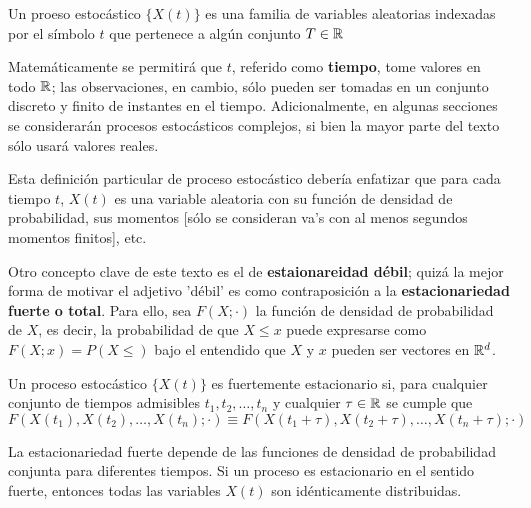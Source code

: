 \begin{defn}
Un proeso estoc\'astico $\{ X(t) \}$ es una familia de variables aleatorias indexadas por el 
s\'imbolo $t$ que pertenece a alg\'un conjunto $T \in \mathbb{R}$
\end{defn}

Matem\'aticamente se permitir\'a que $t$, referido como \textbf{tiempo}, tome valores 
en todo $\mathbb{R}$; las observaciones, en cambio,
s\'olo pueden ser tomadas en un conjunto discreto y finito de instantes en el tiempo. 
Adicionalmente, en algunas secciones se considerar\'an procesos estoc\'asticos complejos,
si bien la mayor parte del texto s\'olo usar\'a valores reales.

Esta definici\'on particular de proceso estoc\'astico deber\'ia enfatizar que para cada 
tiempo $t$, $X(t)$ es una variable aleatoria con su funci\'on de densidad de probabilidad,
sus momentos [s\'olo se consideran va's con al menos segundos momentos finitos], etc.

Otro concepto clave de este texto es el de \textbf{estaionareidad d\'ebil}; 
quiz\'a la mejor forma de motivar el adjetivo 'd\'ebil' es como contraposici\'on a 
la \textbf{estacionariedad fuerte o total}. 
Para ello, sea $F(X;\cdot)$ la funci\'on de densidad de probabilidad de $X$, es decir, 
la probabilidad de que $X\leq x$ puede expresarse como 
$
F(X;x) = P(X\leq)
$
bajo el entendido que $X$ y $x$ pueden ser vectores en $\mathbb{R}^{d}$.

\begin{defn}
Un proceso estoc\'astico $\{ X(t) \}$ es fuertemente estacionario si, para cualquier 
conjunto de tiempos admisibles $t_1,t_2,\dots,t_n$ y cualquier $\tau \in \mathbb{R}$
se cumple que
\begin{equation*}
F\left(X(t_1),X(t_2),\dots,X(t_n);\cdot\right) 
\equiv
F\left(X(t_1+\tau),X(t_2+\tau),\dots,X(t_n+\tau);\cdot\right)
\end{equation*}
\end{defn}

La estacionariedad fuerte depende de las funciones de densidad de probabilidad conjunta para
diferentes tiempos. 
Si un proceso es estacionario en el sentido fuerte, entonces todas las variables $X(t)$ son 
id\'enticamente distribuidas.

